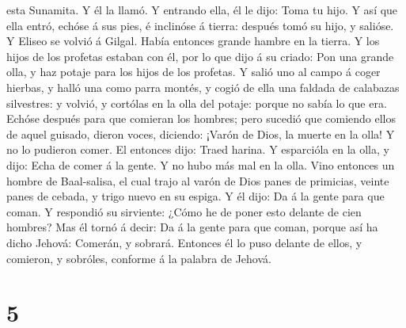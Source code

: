 esta Sunamita. Y él la llamó. Y entrando ella, él le dijo: Toma tu hijo.
 Y así que ella entró, echóse á sus pies, é inclinóse á
tierra: después tomó su hijo, y salióse.  Y Eliseo se
volvió á Gilgal. Había entonces grande hambre en la tierra. Y los hijos
de los profetas estaban con él, por lo que dijo á su criado: Pon una
grande olla, y haz potaje para los hijos de los profetas.
 Y salió uno al campo á coger hierbas, y halló una como
parra montés, y cogió de ella una faldada de calabazas silvestres: y
volvió, y cortólas en la olla del potaje: porque no sabía lo que era.
 Echóse después para que comieran los hombres; pero
sucedió que comiendo ellos de aquel guisado, dieron voces, diciendo:
¡Varón de Dios, la muerte en la olla! Y no lo pudieron comer.
 El entonces dijo: Traed harina. Y esparcióla en la olla,
y dijo: Echa de comer á la gente. Y no hubo más mal en la olla.
 Vino entonces un hombre de Baal-salisa, el cual trajo al
varón de Dios panes de primicias, veinte panes de cebada, y trigo nuevo
en su espiga. Y él dijo: Da á la gente para que coman.  Y
respondió su sirviente: ¿Cómo he de poner esto delante de cien hombres?
Mas él tornó á decir: Da á la gente para que coman, porque así ha dicho
Jehová: Comerán, y sobrará.  Entonces él lo puso delante
de ellos, y comieron, y sobróles, conforme á la palabra de Jehová.

\hypertarget{section-4}{%
\section{5}\label{section-4}}

